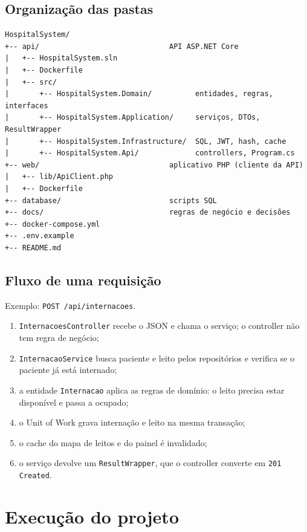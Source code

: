 \documentclass[12pt,a4paper]{article}
\newcommand{\cod}[1]{\texttt{#1}}
\begin{document}
\subsection{Organização das pastas}

\begin{lstlisting}
HospitalSystem/
+-- api/                              API ASP.NET Core
|   +-- HospitalSystem.sln
|   +-- Dockerfile
|   +-- src/
|       +-- HospitalSystem.Domain/          entidades, regras, interfaces
|       +-- HospitalSystem.Application/     serviços, DTOs, ResultWrapper
|       +-- HospitalSystem.Infrastructure/  SQL, JWT, hash, cache
|       +-- HospitalSystem.Api/             controllers, Program.cs
+-- web/                              aplicativo PHP (cliente da API)
|   +-- lib/ApiClient.php
|   +-- Dockerfile
+-- database/                         scripts SQL
+-- docs/                             regras de negócio e decisões
+-- docker-compose.yml
+-- .env.example
+-- README.md
\end{lstlisting}

\subsection{Fluxo de uma requisição}

Exemplo: \cod{POST /api/internacoes}.

\begin{enumerate}[itemsep=2pt]
  \item \cod{InternacoesController} recebe o JSON e chama o serviço; o controller não tem regra de negócio;
  \item \cod{InternacaoService} busca paciente e leito pelos repositórios e verifica se o paciente já está internado;
  \item a entidade \cod{Internacao} aplica as regras de domínio: o leito precisa estar disponível e passa a ocupado;
  \item o Unit of Work grava internação e leito na mesma transação;
  \item o cache do mapa de leitos e do painel é invalidado;
  \item o serviço devolve um \cod{ResultWrapper}, que o controller converte em \cod{201 Created}.
\end{enumerate}

\section{Execução do projeto}
\end{document}
